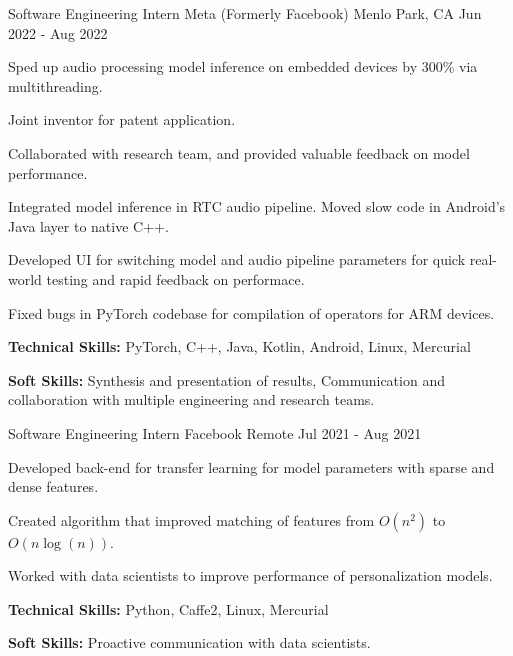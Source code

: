 

\begin{cventries}

  \cventry
    {Software Engineering Intern} %
    {Meta (Formerly Facebook)} %
    {Menlo Park, CA} %
    {Jun 2022 - Aug 2022} %
    {
      \begin{cvitems} %
        \item {Sped up audio processing model inference on embedded devices by 300\% via multithreading.}
        \item {Joint inventor for patent application.}
        \item {Collaborated with research team, and provided valuable feedback on model performance.}
        \item {Integrated model inference in RTC audio pipeline. Moved slow code in Android's Java layer to native C++.}
        \item {Developed UI for switching model and audio pipeline parameters for quick real-world testing and rapid feedback on performace.}
        \item {Fixed bugs in PyTorch codebase for compilation of operators for ARM devices.}
        \item {\textbf{Technical Skills:} PyTorch, C++, Java, Kotlin, Android, Linux, Mercurial}
        \item {\textbf{Soft Skills:} Synthesis and presentation of results, Communication and collaboration with multiple engineering and research teams.}
      \end{cvitems}
    }

  \cventry
    {Software Engineering Intern} %
    {Facebook} %
    {Remote} %
    {Jul 2021 - Aug 2021} %
    {
      \begin{cvitems} %
        \item {Developed back-end for transfer learning for model parameters with sparse and dense features.}
        \item {Created algorithm that improved matching of features from $O(n^2)$ to $O(n\log(n))$.}
        \item {Worked with data scientists to improve performance of personalization models.}
        \item {\textbf{Technical Skills:} Python, Caffe2, Linux, Mercurial}
        \item {\textbf{Soft Skills:} Proactive communication with data scientists.}
      \end{cvitems}
    }


\end{cventries}
